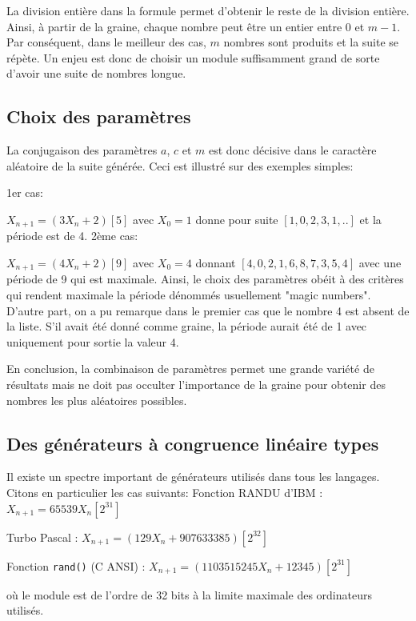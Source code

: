 \documentclass{scrartcl}
\begin{document}
La division entière dans la formule permet d'obtenir le reste de la division
entière. Ainsi, à partir de la graine, chaque nombre peut être un entier entre 0
et $m-1$.  Par conséquent, dans le meilleur des cas, $m$ nombres sont produits
et la suite se répète.  Un enjeu est donc de choisir un module suffisamment
grand de sorte d'avoir une suite de nombres longue.

\subsection{Choix des paramètres}
La conjugaison des paramètres $a$, $c$ et $m$ est donc décisive dans le
caractère aléatoire de la suite générée. Ceci est illustré sur des exemples
simples:

1er cas:\par
$X_{n+1} = (3 X_n +2)[5]$ avec $X_0 = 1$ donne pour suite $[1,0,2,3,1,..]$ et la
période est de 4.  2ème cas:\par
$X_{n+1} = (4 X_n +2)[9]$ avec $X_0 = 4$ donnant $[4,0,2,1,6,8,7,3,5,4]$ avec
une période de 9 qui est maximale.  Ainsi, le choix des paramètres obéit à des
critères qui rendent maximale la période dénommés usuellement "magic numbers".
D'autre part, on a pu remarque dans le premier cas que le nombre 4 est absent de
la liste. S'il avait été donné comme graine, la période aurait été de 1 avec
uniquement pour sortie la valeur 4.

En conclusion, la combinaison de paramètres permet une grande variété de
résultats mais ne doit pas occulter l'importance de la graine pour obtenir des
nombres les plus aléatoires possibles.

\subsection{Des générateurs à congruence linéaire types}
Il existe un spectre important de générateurs utilisés dans tous les
langages. Citons en particulier les cas suivants: Fonction RANDU d'IBM :
$X_{n+1} =65539 X_{n} [2^{31}]$\par
Turbo Pascal : $X_{n+1} =(129 X_{n} + 907633385)[2^{32}]$\par
Fonction \texttt{rand()} (C ANSI) :
$X_{n+1} =(1103515245 X_{n}+12345) [2^{31}]$\par
où le module est de l'ordre de 32 bits à la limite maximale des ordinateurs
utilisés.
\end{document}
